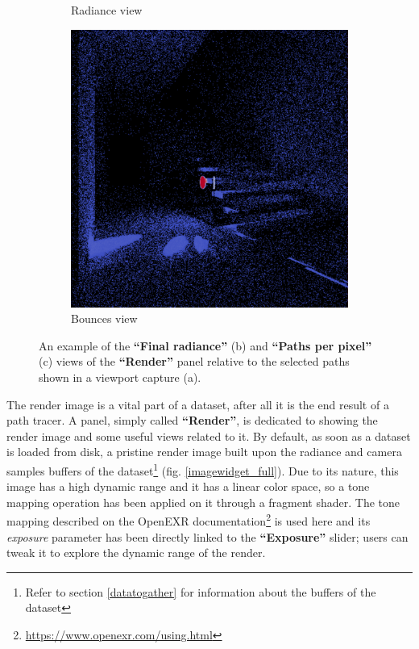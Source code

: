 \begin{figure}
\begin{subfigure}[t]{0.32\linewidth}
		\caption{Radiance view}
		\label{imagewidget_radiance}
	\end{subfigure}
	\begin{subfigure}[t]{0.32\linewidth}
		\includegraphics[width=\textwidth]{chapters/chapter_thetool/imagewidget_bounces}
		\caption{Bounces view}
		\label{imagewidget_bounces}
	\end{subfigure}

	\caption{An example of the \textbf{“Final radiance”} (b) and \textbf{“Paths per pixel”} (c) views of the \textbf{“Render”} panel relative to the selected paths shown in a viewport capture (a).}
	\label{imagewidget_options}
\end{figure}


The render image is a vital part of a dataset, after all it is the end result of a path tracer. A panel, simply called \textbf{“Render”}, is dedicated to showing the render image and some useful views related to it. By default, as soon as a dataset is loaded from disk, a pristine render image built upon the radiance and camera samples buffers of the dataset\footnote{Refer to section \ref{datatogather} for information about the buffers of the dataset} (fig. \ref{imagewidget_full}). Due to its nature, this image has a high dynamic range and it has a linear color space, so a tone mapping operation has been applied on it through a fragment shader. The tone mapping described on the OpenEXR documentation\footnote{\url{https://www.openexr.com/using.html}} is used here and its \textit{exposure} parameter has been directly linked to the \textbf{“Exposure”} slider; users can tweak it to explore the dynamic range of the render.

